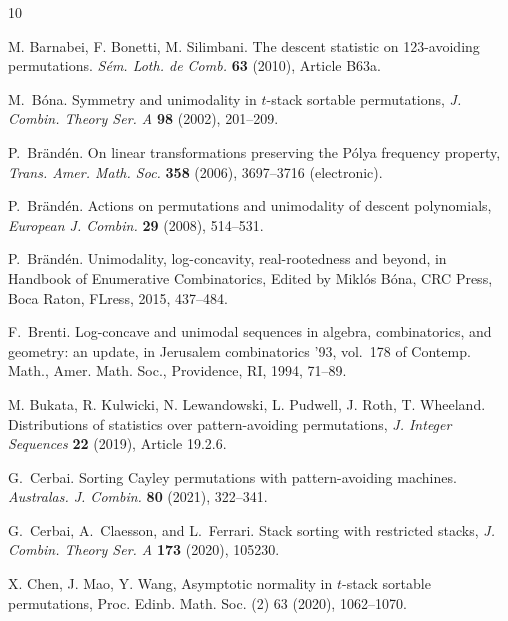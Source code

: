 \documentclass[11pt]{article}
\newcommand{\+}{\mbox{\ensuremath{\scriptstyle{+}}}}
\begin{document}



\begin{thebibliography}{10}

	 M. Barnabei, F. Bonetti, M. Silimbani. The descent statistic on 123-avoiding permutations. {\em S\'em. Loth. de Comb.} {\bf 63} (2010), Article B63a.

	M.~B{\'o}na. Symmetry and unimodality in {$t$}-stack sortable permutations, {\em J.
			Combin. Theory Ser. A} {\bf 98} (2002), 201--209.

	P.~Br{\"a}nd{\'e}n. On linear transformations preserving the {P}\'olya
	frequency property, {\em Trans. Amer. Math. Soc.} {\bf 358} (2006), 3697--3716
	(electronic).

	P.~Br{\"a}nd{\'e}n. Actions on permutations and unimodality of descent
	polynomials, {\em European J. Combin.} {\bf 29} (2008), 514--531.

	P.~Br{\"a}nd{\'e}n. Unimodality, log-concavity, real-rootedness and beyond, in
	Handbook of Enumerative Combinatorics, Edited by Mikl{\'o}s B{\'o}na, CRC
	Press, Boca Raton, FLress, 2015, 437--484.

	F.~Brenti. Log-concave and unimodal sequences in algebra, combinatorics, and
	geometry: an update, in Jerusalem combinatorics '93, vol.~178 of Contemp.
	Math., Amer. Math. Soc., Providence, RI, 1994, 71--89.

	 M. Bukata, R. Kulwicki, N. Lewandowski, L. Pudwell, J. Roth, T. Wheeland. Distributions of statistics over pattern-avoiding permutations, {\em J. Integer Sequences} {\bf 22} (2019), Article 19.2.6.

	 G.~Cerbai. Sorting Cayley permutations with pattern-avoiding machines. {\em Australas. J. Combin.} {\bf 80} (2021), 322--341.

	G.~Cerbai, A.~Claesson, and L.~Ferrari. Stack sorting with restricted stacks,
	{\em J. Combin. Theory Ser. A} {\bf 173} (2020), 105230.

X. Chen, J. Mao, Y. Wang, Asymptotic normality in $t$-stack sortable permutations, Proc. Edinb. Math. Soc. (2) 63 (2020), 1062--1070.



\end{thebibliography}
\end{document}
